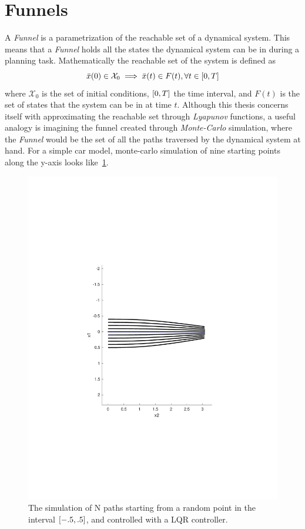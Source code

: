 \section{Funnels}

A \textit{Funnel} is a parametrization of the reachable set of a dynamical
system. This means that a \textit{Funnel} holds all the states the dynamical
system can be in during a planning task. Mathematically the reachable set of the
system is defined as
\[
  \bar{x}(0) \in \mathcal{X}_0 \implies \bar{x}(t) \in F(t), \forall t \in
  \lbrack0,T\rbrack
\]
where \(\mathcal{X}_0\) is the set of initial conditions, \(\lbrack0,T\rbrack\) the time
interval, and \(F(t)\) is the set of states that the system can be in at time
\(t\). Although this thesis concerns itself with approximating the reachable set
through \textit{Lyapunov} functions, a useful analogy is imagining the funnel
created through \textit{Monte-Carlo} simulation, where the \textit{Funnel} would
be the set of all the paths traversed by the dynamical system at hand. For a
simple car model, monte-carlo simulation of nine starting points along the
y-axis looks like~\cref{fig:monte-carlo-sim}.

\begin{figure}
  \centering \includegraphics[scale=.5]{figures/preliminaries/montecarlofunnel}
  \caption{The simulation of N paths starting from a random point in the
    interval \(\lbrack-.5,.5\rbrack\), and controlled with a LQR controller.}
  \label{fig:monte-carlo-sim}
\end{figure}

